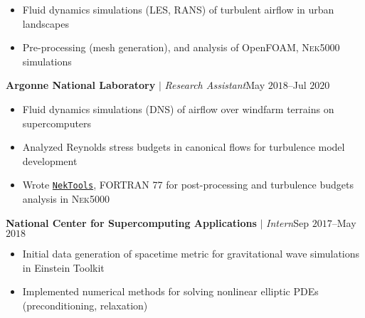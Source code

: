 \documentclass[10pt]{article}
\begin{document}
\begin{multicols}{2}
\vspace{-1.75em}
\begin{itemize}[label=-,leftmargin=1.0em]
    \setlength\itemsep{-0.25em}
    \item Fluid dynamics simulations (LES, RANS) of turbulent airflow in urban landscapes
    \item Pre-processing (mesh generation), and analysis of OpenFOAM, \textsc{Nek5000} simulations
\end{itemize}
\vspace{-2.0em}

\vspace{0.5em}
%
\textbf{Argonne National Laboratory} $|$ \textit{Research Assistant}\hfill May $2018$--Jul $2020$

\vspace{-1.75em}
\begin{itemize}[label=-,leftmargin=1.0em]
    \setlength\itemsep{-0.25em}
    \item Fluid dynamics simulations (DNS) of airflow over windfarm terrains on supercomputers
    \item Analyzed Reynolds stress budgets in canonical flows for turbulence model development
    \item Wrote \href{https://github.com/vpuri3/NekTools}{\texttt{NekTools}}, FORTRAN 77 for post-processing and turbulence budgets analysis in \textsc{Nek5000}
\end{itemize}
\vspace{-2.0em}

\vspace{0.5em}
%
\textbf{National Center for Supercomputing Applications} $|$ \textit{Intern}\hfill Sep $2017$--May $2018$

\vspace{-1.75em}
\begin{itemize}[label=-,leftmargin=1.0em]
    \setlength\itemsep{-0.25em}
    \item Initial data generation of spacetime metric for gravitational wave simulations in Einstein Toolkit
    \item Implemented numerical methods for solving nonlinear elliptic PDEs (preconditioning, relaxation)
\end{itemize}
\vspace{-2.0em}


\end{multicols}
\end{document}
